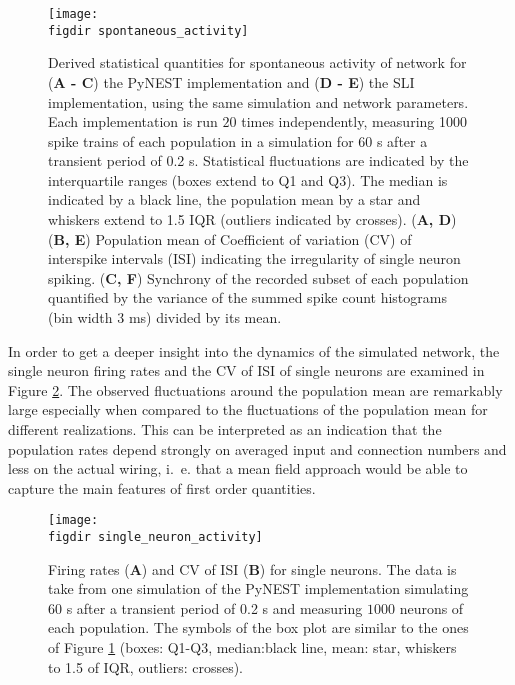 \begin{figure}[tb]
    \centering
    \texttt{[image: \\figdir spontaneous\_activity]}
    \caption{
        Derived statistical quantities for spontaneous activity of network for
        (\textbf{A - C}) the PyNEST implementation and (\textbf{D - E}) the SLI implementation, 
        using the same simulation and network parameters.
        Each implementation is run $20$ times independently, 
        measuring 1000 spike trains of each population in a simulation for 60 s 
        after a transient period of 0.2 s. 
        Statistical fluctuations 
        are indicated by the interquartile ranges (boxes extend to Q1 and Q3). 
        The median is indicated by a black line, the population mean by a star and 
        whiskers extend to 1.5 IQR (outliers indicated by crosses). 
        \quad (\textbf{A, D}) 
        \quad (\textbf{B, E}) Population mean of Coefficient of variation (CV) of interspike intervals (ISI) indicating 
        the irregularity of single neuron spiking. 
        \quad (\textbf{C, F}) Synchrony of the recorded subset of each population quantified by the 
        variance of the summed spike count histograms (bin width 3 ms) divided by
        its mean. 
    }
    \label{fig:spontaneous_activity}
\end{figure}

In order to get a deeper insight into the dynamics of the simulated network, the single neuron firing 
rates and the CV of ISI of single neurons are examined in Figure \ref{fig:single_neuron_activity}.
The observed fluctuations around the population mean are remarkably large especially when compared 
to the fluctuations of the population mean for different realizations. This can be interpreted as 
an indication that the population rates depend strongly on averaged input and connection numbers
and less on the actual wiring, i.~e. that a mean field approach would be able to capture the main features 
of first order quantities. 
\begin{figure}[tb]
    \centering
    \texttt{[image: \\figdir single\_neuron\_activity]}
    \caption{
        Firing rates (\textbf{A}) and CV of ISI (\textbf{B}) for single neurons. 
        The data is take from one simulation of the PyNEST implementation 
        simulating $60$ s after a transient period of 0.2 s and measuring 
        $1000$ neurons of each population. The symbols of the box plot 
        are similar to the ones of Figure \ref{fig:spontaneous_activity} 
        (boxes: Q1-Q3, median:black line, mean: star, 
        whiskers to 1.5 of IQR, outliers: crosses). 
    }
    \label{fig:single_neuron_activity}
\end{figure}

